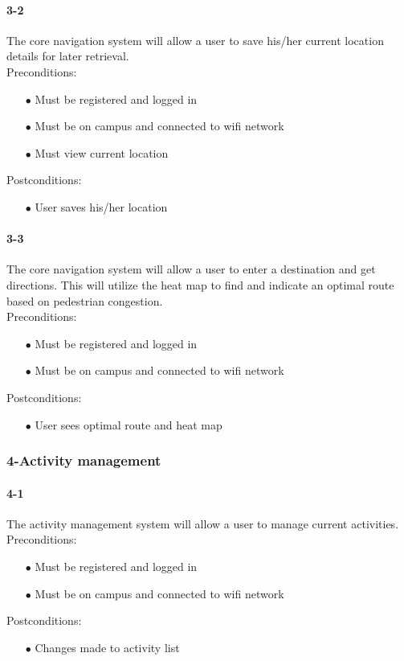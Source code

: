 \documentclass[a4paper,12pt]{article}
\begin{document}
\paragraph{3-2}
The core navigation system will allow a user to save his/her current location details for later retrieval.\\
Preconditions:
\begin{itemize}
	\item[$\bullet$] Must be registered and logged in
	\item[$\bullet$] Must be on campus and connected to wifi network
	\item[$\bullet$] Must view current location
\end{itemize}
Postconditions:
\begin{itemize}
	\item[$\bullet$] User saves his/her location
\end{itemize}
\paragraph{3-3}
The core navigation system will allow a user to enter a destination and get directions. This will utilize the heat map to find and indicate an optimal route based on pedestrian congestion.\\
Preconditions:
\begin{itemize}
	\item[$\bullet$] Must be registered and logged in
	\item[$\bullet$] Must be on campus and connected to wifi network
\end{itemize}
Postconditions:
\begin{itemize}
	\item[$\bullet$] User sees optimal route and heat map
\end{itemize}
\subsubsection{4-Activity management}
\paragraph{4-1}
The activity management system will allow a user to manage current activities.\\
Preconditions:
\begin{itemize}
	\item[$\bullet$] Must be registered and logged in
	\item[$\bullet$] Must be on campus and connected to wifi network
\end{itemize}
Postconditions:
\begin{itemize}
	\item[$\bullet$] Changes made to activity list
\end{itemize}
\end{document}
